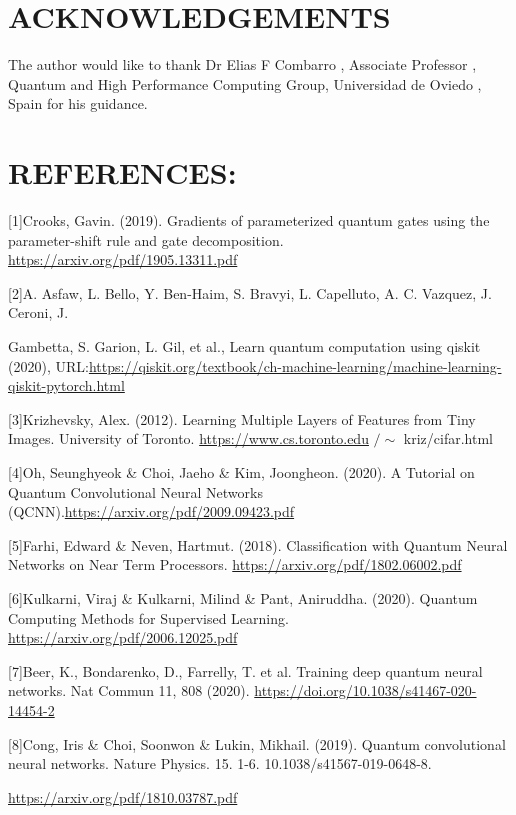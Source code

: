 \documentclass[10pt]{article}
\begin{document}
\section{ACKNOWLEDGEMENTS}

The author would like to thank Dr Elias F Combarro , Associate Professor , Quantum and High Performance Computing Group, Universidad de Oviedo , Spain for his guidance.
\section{REFERENCES:}
[1]Crooks, Gavin. (2019). Gradients of parameterized quantum gates using the parameter-shift rule and gate decomposition. \href{https://arxiv.org/pdf/1905.13311.pdf}{https://arxiv.org/pdf/1905.13311.pdf}

[2]A. Asfaw, L. Bello, Y. Ben-Haim, S. Bravyi, L. Capelluto, A. C. Vazquez, J. Ceroni, J.

Gambetta, S. Garion, L. Gil, et al., Learn quantum computation using qiskit (2020), URL:\href{https://qiskit.org/textbook/ch-machine-learning/machine-learning-qiskit-pytorch.html}{https://qiskit.org/textbook/ch-machine-learning/machine-learning-qiskit-pytorch.html}

[3]Krizhevsky, Alex. (2012). Learning Multiple Layers of Features from Tiny Images. University of Toronto. \href{https://www.cs.toronto.edu}{https://www.cs.toronto.edu} $/ \sim$ kriz/cifar.html

[4]Oh, Seunghyeok \& Choi, Jaeho \& Kim, Joongheon. (2020). A Tutorial on Quantum Convolutional Neural Networks (QCNN).\href{https://arxiv.org/pdf/2009.09423.pdf}{https://arxiv.org/pdf/2009.09423.pdf}

[5]Farhi, Edward \& Neven, Hartmut. (2018). Classification with Quantum Neural Networks on Near Term Processors. \href{https://arxiv.org/pdf/1802.06002.pdf}{https://arxiv.org/pdf/1802.06002.pdf}

[6]Kulkarni, Viraj \& Kulkarni, Milind \& Pant, Aniruddha. (2020). Quantum Computing Methods for Supervised Learning. \href{https://arxiv.org/pdf/2006.12025.pdf}{https://arxiv.org/pdf/2006.12025.pdf}

[7]Beer, K., Bondarenko, D., Farrelly, T. et al. Training deep quantum neural networks. Nat Commun 11, 808 (2020). \href{https://doi.org/10.1038/s41467-020-14454-2}{https://doi.org/10.1038/s41467-020-14454-2}

[8]Cong, Iris \& Choi, Soonwon \& Lukin, Mikhail. (2019). Quantum convolutional neural networks. Nature Physics. 15. 1-6. 10.1038/s41567-019-0648-8.

\href{https://arxiv.org/pdf/1810.03787.pdf}{https://arxiv.org/pdf/1810.03787.pdf}
\end{document}
